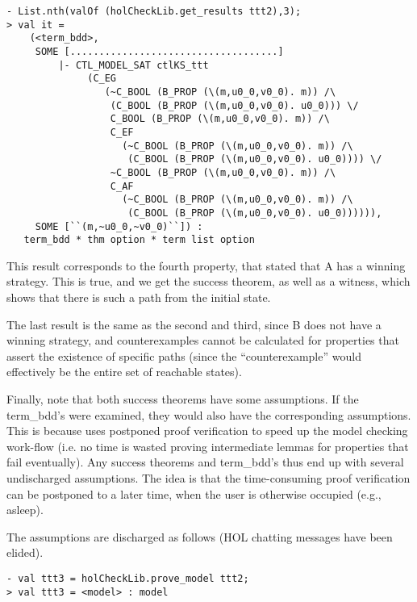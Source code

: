 \begin{session}\begin{verbatim}
- List.nth(valOf (holCheckLib.get_results ttt2),3);
> val it =
    (<term_bdd>,
     SOME [....................................]
         |- CTL_MODEL_SAT ctlKS_ttt
              (C_EG
                 (~C_BOOL (B_PROP (\(m,u0_0,v0_0). m)) /\
                  (C_BOOL (B_PROP (\(m,u0_0,v0_0). u0_0))) \/
                  C_BOOL (B_PROP (\(m,u0_0,v0_0). m)) /\
                  C_EF
                    (~C_BOOL (B_PROP (\(m,u0_0,v0_0). m)) /\
                     (C_BOOL (B_PROP (\(m,u0_0,v0_0). u0_0)))) \/
                  ~C_BOOL (B_PROP (\(m,u0_0,v0_0). m)) /\
                  C_AF
                    (~C_BOOL (B_PROP (\(m,u0_0,v0_0). m)) /\
                     (C_BOOL (B_PROP (\(m,u0_0,v0_0). u0_0)))))),
     SOME [``(m,~u0_0,~v0_0)``]) :
   term_bdd * thm option * term list option
\end{verbatim}\end{session}

This result corresponds to the fourth property, that stated that A has a winning strategy. This is true, and we get the success theorem, as well as a witness, which shows that there is such a path from the initial state.

The last result is the same as the second and third, since B does not have a winning strategy, and counterexamples cannot be calculated for properties that assert the existence of specific paths (since the ``counterexample'' would effectively be the entire set of reachable states).

Finally, note that both success theorems have some assumptions. If the term\_bdd's were examined, they would also have the corresponding assumptions. This is because \hc{} uses postponed proof verification to speed up the model checking work-flow (i.e. no time is wasted proving intermediate lemmas for properties that fail eventually). Any success theorems and term\_bdd's thus end up with several undischarged assumptions. The idea is that the time-consuming proof verification can be postponed to a later time, when the user is otherwise occupied (e.g., asleep).

The assumptions are discharged as follows (HOL chatting messages have been elided).

\begin{session}\begin{verbatim}
- val ttt3 = holCheckLib.prove_model ttt2;
> val ttt3 = <model> : model
\end{verbatim}\end{session}

